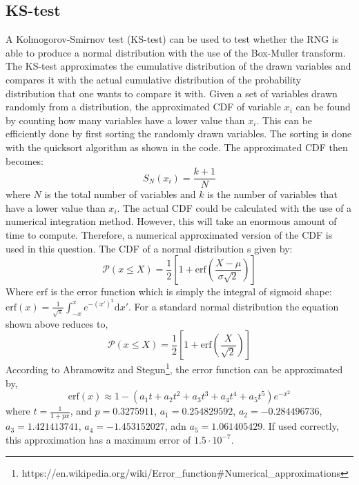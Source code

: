 \subsection{KS-test}
A Kolmogorov-Smirnov test (KS-test) can be used to test whether the RNG is able to produce a normal distribution with the use of the Box-Muller transform. The KS-test approximates the cumulative distribution of the drawn variables and compares it with the actual cumulative distribution of the probability distribution that one wants to compare it with. Given a set of variables drawn randomly from a distribution, the approximated CDF of variable $x_i$ can be found by counting how many variables have a lower value than $x_i$. This can be efficiently done by first sorting the randomly drawn variables. The sorting is done with the quicksort algorithm as shown in the code. The approximated CDF then becomes:
\begin{equation*}
S_N(x_i)= \frac{k+1}{N}
\end{equation*}
where $N$ is the total number of variables and $k$ is the number of variables that have a lower value than $x_i$. The actual CDF could be calculated with the use of a numerical integration method. However, this will take an enormous amount of time to compute. Therefore, a numerical approximated version of the CDF is used in this question. The CDF of a  normal distribution s given by:
\begin{equation*}
\mathcal{P}(x \leq X) = \frac{1}{2}\left[1 + \mathrm{erf}\left(\frac{X-\mu}{\sigma \sqrt{2}}\right)\right]
\end{equation*}
Where $\mathrm{erf}$ is the error function which is simply the integral of sigmoid shape: $\mathrm{erf}(x) = \frac{1}{\sqrt{\pi}}\int_{-x}^x e^{-(x')^2}\mathrm{d}x'$. For a standard normal distribution the equation shown above reduces to,
\begin{equation*}
\mathcal{P}(x \leq X) = \frac{1}{2}\left[1+\mathrm{erf}\left(\frac{X}{\sqrt{2}}\right)\right]
\end{equation*}
According to Abramowitz and Stegun\footnote{https://en.wikipedia.org/wiki/Error\_function\#Numerical\_approximations}, the error function can be approximated by,
\begin{equation*}
\mathrm{erf}(x) \approx 1 - (a_1 t + a_2 t^2 + a_3t^3 + a_4t^4 + a_5t^5)e^{-x^2}
\end{equation*}
where $t = \frac{1}{1+px}$, and $p = 0.3275911$, $a_1 = 0.254829592$, $a_2 = -0.284496736$, $a_3 = 1.421413741$, $a_4 = -1.453152027$, adn $a_5 = 1.061405429$. If used correctly, this approximation has a maximum error of $1.5\cdot 10^{-7}$.
